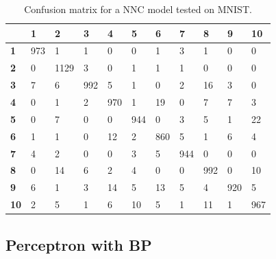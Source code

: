 \documentclass[journal]{IEEEtran}
\begin{document}
\begin{table}[H]
	\centering
	\begin{tabular}{|l|l|l|l|l|l|l|l|l|l|l|} \hline
		{\ul }      & \textbf{1} & \textbf{2} & \textbf{3} & \textbf{4} & \textbf{5} & \textbf{6} & \textbf{7} & \textbf{8} & \textbf{9} & \textbf{10} \\ \hline
		\textbf{1}  & 973        & 1          & 1          & 0          & 0          & 1          & 3          & 1          & 0          & 0           \\
		\textbf{2}  & 0          & 1129       & 3          & 0          & 1          & 1          & 1          & 0          & 0          & 0           \\
		\textbf{3}  & 7          & 6          & 992        & 5          & 1          & 0          & 2          & 16         & 3          & 0           \\
		\textbf{4}  & 0          & 1          & 2          & 970        & 1          & 19         & 0          & 7          & 7          & 3           \\
		\textbf{5}  & 0          & 7          & 0          & 0          & 944        & 0          & 3          & 5          & 1          & 22          \\
		\textbf{6}  & 1          & 1          & 0          & 12         & 2          & 860        & 5          & 1          & 6          & 4           \\
		\textbf{7}  & 4          & 2          & 0          & 0          & 3          & 5          & 944        & 0          & 0          & 0           \\
		\textbf{8}  & 0          & 14         & 6          & 2          & 4          & 0          & 0          & 992        & 0          & 10          \\
		\textbf{9}  & 6          & 1          & 3          & 14         & 5          & 13         & 5          & 4          & 920        & 5           \\
		\textbf{10} & 2          & 5          & 1          & 6          & 10         & 5          & 1          & 11         & 1          & 967 \\ \hline   
	\end{tabular}
	\caption{Confusion matrix for a NNC model tested on MNIST.}
	\label{table:nnconfusion}
\end{table}

\subsection{Perceptron with BP}
\end{document}
